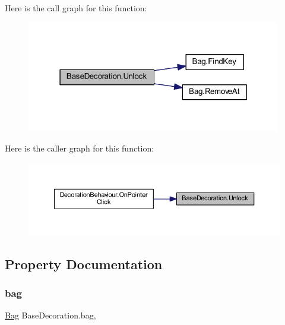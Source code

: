 Here is the call graph for this function\+:
\nopagebreak
\begin{figure}[H]
\begin{center}
\leavevmode
\includegraphics[width=316pt]{class_base_decoration_a820de02d0bb917f7cee59a4759da6251_cgraph}
\end{center}
\end{figure}
Here is the caller graph for this function\+:
\nopagebreak
\begin{figure}[H]
\begin{center}
\leavevmode
\includegraphics[width=350pt]{class_base_decoration_a820de02d0bb917f7cee59a4759da6251_icgraph}
\end{center}
\end{figure}


\subsection{Property Documentation}
\mbox{\label{class_base_decoration_ac89ba4289b6d0b80d564aeb969615a3f}} 
\subsubsection{\texorpdfstring{bag}{bag}}
{\footnotesize\ttfamily \mbox{\hyperlink{class_bag}{Bag}} Base\+Decoration.\+bag\hspace{0.3cm}{\ttfamily [get]}, {\ttfamily [set]}}

\mbox{\label{class_base_decoration_a7d83022e124cdef6c7484c0689c94352}} 

